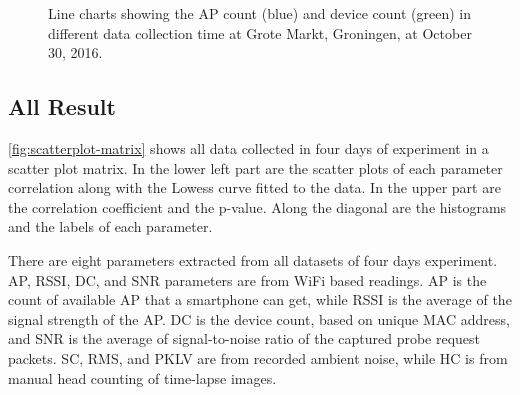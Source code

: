 \begin{figure}[h]
\begin{adjustwidth}{-1cm}{}
{{		  }
		}
		\caption{Line charts showing the \ac{AP} count (blue) and device count (green) in different data collection time at Grote Markt, Groningen, at October 30, 2016.}
		\label{fig:time-effect}
		\end{adjustwidth}
	\end{figure}









	\subsection{All Result} %
	\label{sub:all_result}
	\autoref{fig:scatterplot-matrix} shows all data collected in four days of experiment in a scatter plot matrix. In the lower left part are the scatter plots of each parameter correlation along with the Lowess curve fitted to the data. In the upper part are the correlation coefficient and the p-value. Along the diagonal are the histograms and the labels of each parameter.

	There are eight parameters extracted from all datasets of four days experiment. \ac{AP}, \ac{RSSI}, \ac{DC}, and \ac{SNR} parameters are from WiFi based readings. \ac{AP} is the count of available \ac{AP} that a smartphone can get, while \ac{RSSI} is the average of the signal strength of the \ac{AP}. \ac{DC} is the device count, based on unique \ac{MAC} address, and \ac{SNR} is the average of signal-to-noise ratio of the captured probe request packets. \ac{SC}, \ac{RMS}, and \ac{PKLV} are from recorded ambient noise, while \ac{HC} is from manual head counting of time-lapse images.


